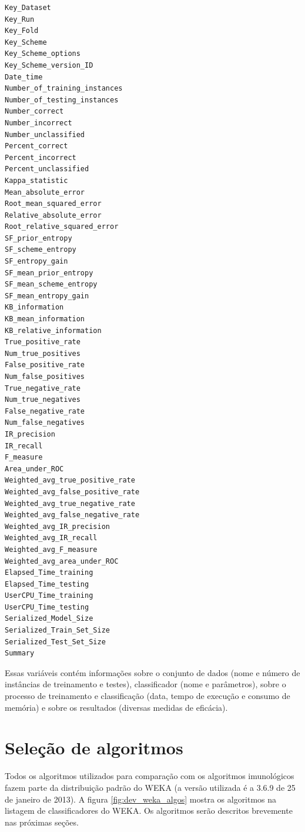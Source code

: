 \vspace{0.5cm}
\begin{lstlisting}[caption=Variáveis gravados pelo \emph{Experimenter}, label=lst:dev_experimenter_header]
Key_Dataset
Key_Run
Key_Fold
Key_Scheme
Key_Scheme_options
Key_Scheme_version_ID
Date_time
Number_of_training_instances
Number_of_testing_instances
Number_correct
Number_incorrect
Number_unclassified
Percent_correct
Percent_incorrect
Percent_unclassified
Kappa_statistic
Mean_absolute_error
Root_mean_squared_error
Relative_absolute_error
Root_relative_squared_error
SF_prior_entropy
SF_scheme_entropy
SF_entropy_gain
SF_mean_prior_entropy
SF_mean_scheme_entropy
SF_mean_entropy_gain
KB_information
KB_mean_information
KB_relative_information
True_positive_rate
Num_true_positives
False_positive_rate
Num_false_positives
True_negative_rate
Num_true_negatives
False_negative_rate
Num_false_negatives
IR_precision
IR_recall
F_measure
Area_under_ROC
Weighted_avg_true_positive_rate
Weighted_avg_false_positive_rate
Weighted_avg_true_negative_rate
Weighted_avg_false_negative_rate
Weighted_avg_IR_precision
Weighted_avg_IR_recall
Weighted_avg_F_measure
Weighted_avg_area_under_ROC
Elapsed_Time_training
Elapsed_Time_testing
UserCPU_Time_training
UserCPU_Time_testing
Serialized_Model_Size
Serialized_Train_Set_Size
Serialized_Test_Set_Size
Summary
\end{lstlisting}
\vspace{0.5cm}

Essas variáveis contém informações sobre o conjunto de dados (nome e número de instâncias de treinamento e testes), classificador (nome e parâmetros), sobre o processo de treinamento e classificação (data, tempo de execução e consumo de memória) e sobre os resultados (diversas medidas de eficácia).

\section{Seleção de algoritmos}

Todos os algoritmos utilizados para comparação com os algoritmos imunológicos fazem parte da distribuição padrão do WEKA (a versão utilizada é a 3.6.9 de 25 de janeiro de 2013). A figura \ref{fig:dev_weka_algos} mostra os algoritmos na listagem de classificadores do WEKA. Os algoritmos serão descritos brevemente nas próximas seções.

